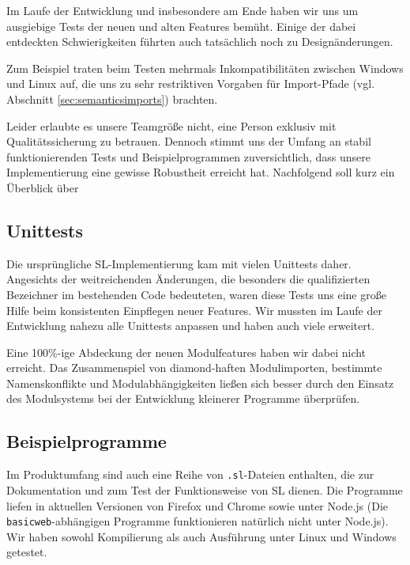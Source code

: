 \documentclass[runningheads]{llncs}
\begin{document}
Im Laufe der Entwicklung und insbesondere am Ende haben wir uns um ausgiebige
Tests der neuen und alten Features bemüht. Einige der dabei entdeckten
Schwierigkeiten führten auch tatsächlich noch zu Designänderungen.

Zum Beispiel traten beim Testen mehrmals Inkompatibilitäten zwischen Windows
und Linux auf, die uns zu sehr restriktiven Vorgaben für Import-Pfade
(vgl. Abschnitt \ref{sec:semanticsimports}) brachten.

Leider erlaubte es unsere Teamgröße nicht, eine Person exklusiv mit
Qualitätssicherung zu betrauen. Dennoch stimmt uns der Umfang an stabil
funktionierenden Tests und Beispielprogrammen zuversichtlich, dass unsere
Implementierung eine gewisse Robustheit erreicht hat. Nachfolgend soll
kurz ein Überblick über 

\subsection{Unittests}

Die ursprüngliche SL-Implementierung kam mit vielen Unittests daher.
Angesichts der weitreichenden Änderungen, die besonders die qualifizierten
Bezeichner im bestehenden Code bedeuteten, waren diese Tests uns eine große
Hilfe beim konsistenten Einpflegen neuer Features. Wir mussten im Laufe der
Entwicklung nahezu alle Unittests anpassen und haben auch viele erweitert.

Eine 100\%-ige Abdeckung der neuen Modulfeatures haben wir dabei nicht erreicht.
Das Zusammenspiel von diamond-haften Modulimporten, bestimmte Namenskonflikte
und Modulabhängigkeiten ließen sich besser durch den Einsatz des Modulsystems
bei der Entwicklung kleinerer Programme überprüfen.

\subsection{Beispielprogramme}
\label{sec:sampleApps}

Im Produktumfang sind auch eine Reihe von \verb|.sl|-Dateien enthalten, die
zur Dokumentation und zum Test der Funktionsweise von SL dienen. Die Programme
liefen in aktuellen Versionen von Firefox und Chrome sowie unter Node.js
(Die \verb|basicweb|-abhängigen Programme funktionieren natürlich nicht unter
Node.js). Wir haben sowohl Kompilierung als auch Ausführung unter Linux und
Windows getestet.
\end{document}
